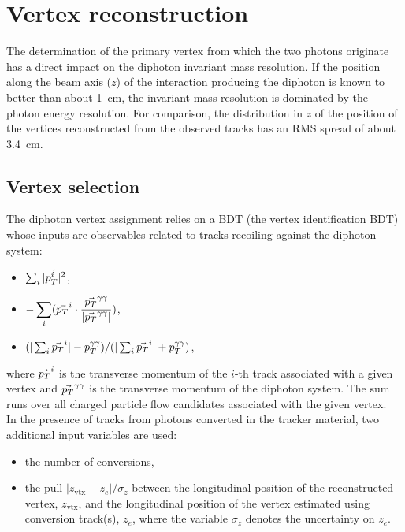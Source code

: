 \section{Vertex reconstruction}

The determination of the primary vertex from which the two photons
originate has a direct impact on the diphoton invariant mass resolution.
If the position along the beam axis ($z$) of the interaction producing
the diphoton is known to better than about \SI{1}{cm}, the invariant mass
resolution is dominated by the photon energy resolution.
For comparison, the distribution in $z$ of the position of the vertices reconstructed
from the observed tracks has an \textsc{RMS} spread of about \SI{3.4}{cm}.

\subsection{Vertex selection}

The diphoton vertex assignment relies on a BDT (the vertex identification BDT)
whose inputs are observables related to tracks
recoiling against the diphoton system:
\begin{itemize}
        \item $\sum_{i}|\vec{p_T^{i}}|^{2}$,
        \item $\displaystyle -\sum_{i}(\vec{p_T}^{i}\cdot \frac{\vec{p_T}^{\gamma\gamma}}{|\vec{p_T}^{\gamma\gamma}|})$,
        \item $(|\sum_{i}\vec{p_T}^{i}| - p_T^{\gamma\gamma})/(|\sum_{i}\vec{p_T}^{i}| + p_T^{\gamma\gamma})$,
\end{itemize}
where $\vec{p_T}^{i}$ is the transverse momentum of the $i$-th track
associated with a given vertex and $\vec{p_T}^{\gamma\gamma}$ is the
transverse momentum of the diphoton system. The sum runs over all
charged particle flow candidates associated with the given vertex.\\
In the presence of tracks from photons converted in the tracker material,
two additional input variables are used:
\begin{itemize}
        \item the number of conversions,
        \item the pull $|z_{\text{vtx}} - z_e| /\sigma_{z}$ between the
                longitudinal position of the reconstructed vertex,
                $z_{\text{vtx}}$, and the longitudinal position of the
                vertex estimated using conversion track(s), $z_e$,
                where the variable $\sigma_{z}$ denotes the uncertainty 
                on $z_e$.
\end{itemize}

